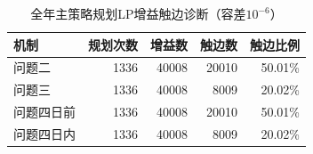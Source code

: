 \begin{table}[htbp]\centering\small
\caption{全年主策略规划LP增益触边诊断（容差$10^{-6}$）}
\begin{tabular}{lrrrr}
\toprule
机制 & 规划次数 & 增益数 & 触边数 & 触边比例 \\
\midrule
问题二 & 1336 & 40008 & 20010 & 50.01\% \\
问题三 & 1336 & 40008 & 8009 & 20.02\% \\
问题四日前 & 1336 & 40008 & 20010 & 50.01\% \\
问题四日内 & 1336 & 40008 & 8009 & 20.02\% \\
\bottomrule\end{tabular}\end{table}
